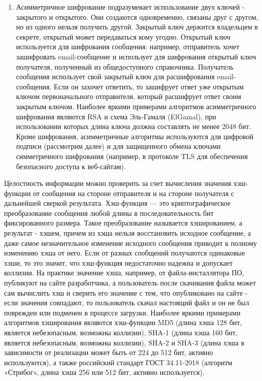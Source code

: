 \begin{enumerate}
    \item Асимметричное шифрование подразумевает использование двух ключей -
        закрытого и открытого. Они создаются одновременно, связаны друг с
        другом, но из одного нельзя получить другой. Закрытый ключ держится
        владельцем в секрете, открытый может передаваться кому угодно. Открытый
        ключ используется для шифрования сообщения: например, отправитель хочет
        зашифровать email-сообщение и использует для шифрования открытый ключ
        получателя, полученный из общедоступного справочника. Получатель
        сообщения использует свой закрытый ключ для расшифрования
        email-сообщения. Если он захочет ответить, то зашифрует ответ уже
        открытым ключом первоначального отправителя, который расшифрует ответ
        своим закрытым ключом. Наиболее яркими примерами алгоритмов
        асимметричного шифрования являются RSA и схема Эль-Гамаля (ElGamal),
        при использовании которых длина ключа должна составлять не менее 2048
        бит. Кроме шифрования, асимметричные алгоритмы используются для
        цифровой подписи (рассмотрим далее) и для защищенного обмена ключами
        симметричного шифрования (например, в протоколе TLS для обеспечения
        безопасного доступа к веб-сайтам).
\end{enumerate}

Целостность информации можно проверить за счет вычисления значения хэш-функции
от сообщения на стороне отправителя и на стороне получателя с дальнейшей
сверкой результата. Хэш-функция — это криптографическое преобразование
сообщения любой длины в последовательность бит фиксированного размера. Такое
преобразование называется хэшированием, а результат - хэшем, причем из хэша
нельзя восстановить исходное сообщение, а даже самое незначительное изменение
исходного сообщения приводит к полному изменению хэша от него. Если от разных
сообщений получаются одинаковые хэши, то это значит, что хэш-функция
недостаточно надежна и допускает коллизии. На практике значение хэша, например,
от файла-инсталлятора ПО, публикуют на сайте разработчика, а пользователь после
скачивания файла может сам вычислить хэш и сверить его значение с тем, что
опубликовано на сайте - если значения совпадают, то пользователь скачал
настоящий файл и он не был поврежден или подменен в процессе загрузки. Наиболее
яркими примерами алгоритмов хэширования являются хэш-функции MD5 (длина хэша
128 бит, является небезопасным, возможны коллизии), SHA-1 (длина хэша 160 бит,
является небезопасным, возможны коллизии), SHA-2 и SHA-3 (длина хэша в
зависимости от реализации может быть от 224 до 512 бит, активно используются),
а также российский стандарт ГОСТ 34.11-2018 (алгоритм «Стрибог», длина хэша 256
или 512 бит, активно используется).

